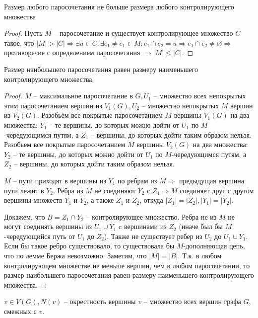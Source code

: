 	\begin{Lm}
		Размер любого паросочетания не больше размера любого контролирующего множества
	\end{Lm}

	\begin{proof}
		Пусть $M$ -- паросочетание и существует контролирующее множество $C$ такое, что $|M| > |C| \Rightarrow \exists u \in C: \exists e_1 \neq e_1\in M: e_1 \cap e_2 = u \Rightarrow e_1 \cap e_2 \neq \varnothing \Rightarrow$ противоречие с определением паросочетания $\Rightarrow |M| \leqslant |C|$.
	\end{proof}

	\begin{Thm}[Кёниг, 1931]
		Размер наибольшего паросочетания равен размеру наименьшего контролирующего множества.
	\end{Thm}

	\begin{proof}
		$M$ -- максимальное паросочетание в $G, U_1$ -- множество всех непокрытых этим паросочетанием вершин из $V_1(G), U_2 $ -- множество непокрытых $M$ вершин из $V_2(G)$.
		Разобьём все покрытые паросочетанием $M$ вершины $V_1(G)$ на два множества: $Y_1$ -- те вершины, до которых можно дойти от $U_1$ по $M$-чередующимся путям, а $Z_1$ -- вершины, до которых дойти таким образом нельзя.
		Разобьем все покрытые паросочетанием $M$ вершины $V_2(G)$ на два множества: $Y_2$ -- те вершины, до которых можно дойти от $U_1$ по $M$-чередующимся путям, а $Z_2$ -- вершины, до которых дойти таким образом нельзя.

		$M$ -- пути приходят в вершины из $Y_1$ по ребрам из $M \Rightarrow$ предыдущая вершина пути лежит в $Y_2$.
		Ребра из $M$ не соединяют $Y_2$ с $Z_1 \Rightarrow M$ соединяет друг с другом вершины множеств $Y_1$ и $Y_2$, а также $Z_1$ и $Z_2$, откуда $|Z_1| = |Z_2|, |Y_1| = |Y_2|$.
	
		Докажем, что $B = Z_1 \cap Y_2$ -- контролирующее множество. Ребра не из $M$ не могут соединять вершины из $U_1 \cup Y_1$ c вершинами из $Z_2$ (иначе был бы $M$-чередующийся путь от $U_1$ до $Z_2$).
		Также не существует ребер из $U_2$ до $U_1 \cup Y_1$. Если бы такое ребро существовало, то существовала бы $M$-дополняющая цепь, что по лемме Бержа невозможно. Заметим, что $|M| = |B|$. 
		Т.к. в любом контролирующем множестве не меньше вершин,  чем в любом паросочетании, то размер наибольшего паросочетания равен размеру наименьшего контролирующего множества.
	\end{proof}

	\begin{Def}
		$v \in V(G), N(v)$ -- окрестность вершины $v$ -- множество всех вершин графа $G$, смежных с $v$.
	\end{Def}

